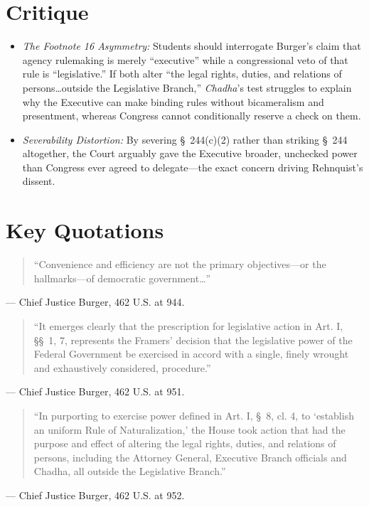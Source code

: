 \documentclass[12pt]{article}
\begin{document}
\section{Critique}
\begin{itemize}
  \item \textit{The Footnote 16 Asymmetry:} Students should interrogate Burger's claim that agency rulemaking is merely ``executive'' while a congressional veto of that rule is ``legislative.'' If both alter ``the legal rights, duties, and relations of persons\ldots outside the Legislative Branch,'' \textit{Chadha}'s test struggles to explain why the Executive can make binding rules without bicameralism and presentment, whereas Congress cannot conditionally reserve a check on them.
  \item \textit{Severability Distortion:} By severing \S~244(c)(2) rather than striking \S~244 altogether, the Court arguably gave the Executive broader, unchecked power than Congress ever agreed to delegate---the exact concern driving Rehnquist's dissent.
\end{itemize}

\section{Key Quotations}
\begin{quote}
``Convenience and efficiency are not the primary objectives---or the hallmarks---of democratic government\ldots''
\end{quote}
\noindent --- Chief Justice Burger, 462 U.S. at 944.

\begin{quote}
``It emerges clearly that the prescription for legislative action in Art. I, \S\S~1, 7, represents the Framers' decision that the legislative power of the Federal Government be exercised in accord with a single, finely wrought and exhaustively considered, procedure.''
\end{quote}
\noindent --- Chief Justice Burger, 462 U.S. at 951.

\begin{quote}
``In purporting to exercise power defined in Art. I, \S~8, cl. 4, to `establish an uniform Rule of Naturalization,' the House took action that had the purpose and effect of altering the legal rights, duties, and relations of persons, including the Attorney General, Executive Branch officials and Chadha, all outside the Legislative Branch.''
\end{quote}
\noindent --- Chief Justice Burger, 462 U.S. at 952.
\end{document}
